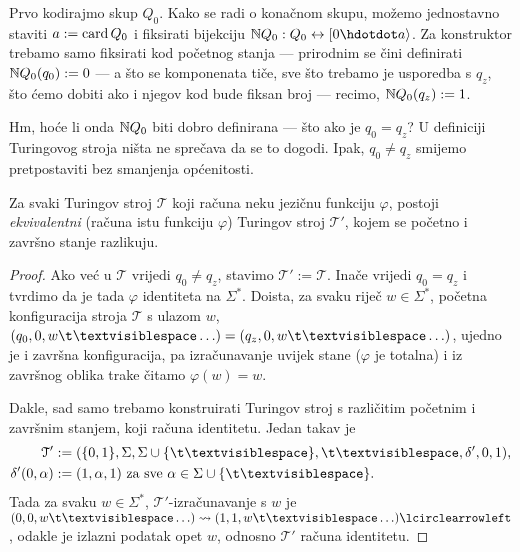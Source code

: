 
Prvo kodirajmo skup $Q_0$. Kako se radi o konačnom skupu, možemo jednostavno staviti $a:=\operatorname{card} Q_0$ i fiksirati bijekciju $\N Q_0:Q_0\leftrightarrow[0\dd a\rangle$. Za konstruktor trebamo samo fiksirati kod početnog stanja --- prirodnim se čini definirati ${\mathbb N} Q_0(q_0):=0$ --- a što se komponenata tiče, sve što trebamo je usporedba s $q_z$, što ćemo dobiti ako i njegov kod bude fiksan broj --- recimo, ${\mathbb N} Q_0(q_z):=1$.

Hm, hoće li onda ${\mathbb N} Q_0$ biti dobro definirana --- što ako je $q_0=q_z$? U definiciji Turingovog stroja ništa ne sprečava da se to dogodi. Ipak, $q_0\ne q_z$ smijemo pretpostaviti bez smanjenja općenitosti.

\begin{lema}[{name=[možemo pretpostaviti $q_0\ne q_z$]}]\label{lm:bsomp-q0neqz}
	Za svaki Turingov stroj $\mathcal T$ koji računa neku jezičnu funkciju $\varphi$, postoji \emph{ekvivalentni} (računa istu funkciju $\varphi$) Turingov stroj $\mathcal T'$, kojem se početno i završno stanje razlikuju.
\end{lema}
\begin{proof}
Ako već u $\mathcal T$ vrijedi $q_0\ne q_z$, stavimo $\mathcal T':=\mathcal T$. Inače vrijedi $q_0=q_z$ i tvrdimo da je tada $\varphi$ identiteta na $\Sigma^*$. Doista, za svaku riječ $w\in\Sigma^*$, početna konfiguracija stroja $\mathcal T$ s ulazom $w$, $(q_0,0,w\bl\ldots)=(q_z,0,w\bl\ldots)$, ujedno je i završna konfiguracija, pa izračunavanje uvijek stane ($\varphi$ je totalna) i iz završnog oblika trake čitamo $\varphi(w)=w$.

Dakle, sad samo trebamo konstruirati Turingov stroj s različitim početnim i za\-vrš\-nim stanjem, koji računa identitetu. Jedan takav je
\begin{align}
    \mathcal T'&:=(\{0,1\},\Sigma,\Sigma\cup\{\bl\},\bl,\delta',0,1)\text,\\
    \delta'(0,\alpha)&:=(1,\alpha,1)\text{ za sve $\alpha\in\Sigma\cup\{\bl\}$.}
\end{align}
Tada za svaku $w\in\Sigma^*$, $\mathcal T'$-izračunavanje s $w$ je $(0,0,w\bl\ldots)\leadsto(1,1,w\bl\ldots)\lcirclearrowleft$, odakle je izlazni podatak opet $w$, odnosno $\mathcal T'$ računa identitetu.
\end{proof}

